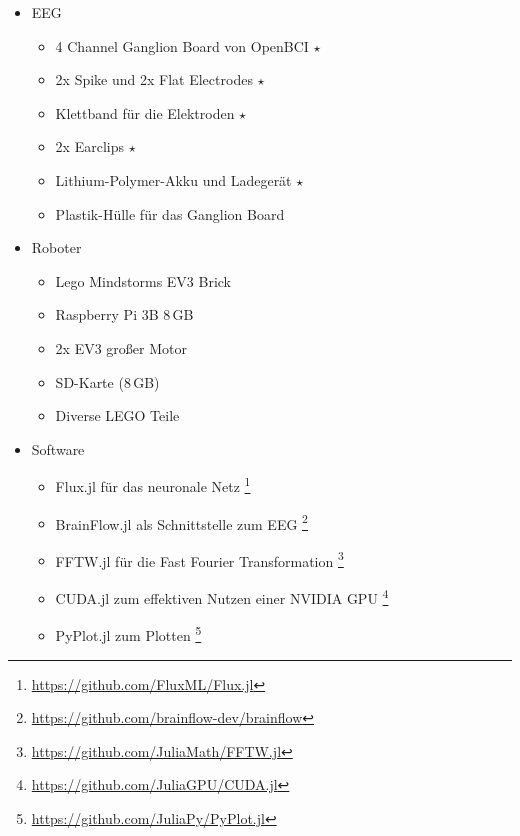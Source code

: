 \documentclass{scrartcl}
\begin{document}
	\begin{itemize}
		\item EEG
		\begin{itemize}
			\item 4 Channel Ganglion Board von OpenBCI $\star$
			\item 2x Spike und 2x Flat Electrodes  $\star$
			\item Klettband für die Elektroden $\star$
			\item 2x Earclips $\star$
			\item Lithium-Polymer-Akku und Ladegerät $\star$
			\item Plastik-Hülle für das Ganglion Board
		\end{itemize}

		\item Roboter
		\begin{itemize}
			\item Lego Mindstorms EV3 Brick
			\item Raspberry Pi 3B 8\,GB
			\item 2x EV3 großer Motor
			\item SD-Karte (8\,GB)
			\item Diverse LEGO Teile
		\end{itemize}

		\item Software
		\begin{itemize}
			\item Flux.jl für das neuronale Netz
				\footnote{\href{https://github.com/FluxML/Flux.jl}{https://github.com/FluxML/Flux.jl}}
				\cite{Flux.jl-2018}
				\cite{innes:2018}
			
			\item BrainFlow.jl als Schnittstelle zum EEG
				\footnote{\href{https://github.com/brainflow-dev/brainflow}{https://github.com/brainflow-dev/brainflow}}
				\cite{brainflow}
			
			\item FFTW.jl für die Fast Fourier Transformation
				\footnote{\href{https://github.com/JuliaMath/FFTW.jl}{https://github.com/JuliaMath/FFTW.jl}}
				\cite{FFTW.jl-2005}
			
			\item CUDA.jl zum effektiven Nutzen einer NVIDIA GPU
				\footnote{\href{https://github.com/JuliaGPU/CUDA.jl}{https://github.com/JuliaGPU/CUDA.jl}}
				\cite{CUDA}
			
			\item PyPlot.jl zum Plotten
				\footnote{\href{https://github.com/JuliaPy/PyPlot.jl}{https://github.com/JuliaPy/PyPlot.jl}}
				\cite{pyplot}
			

\end{itemize}
\end{itemize}
\end{document}

